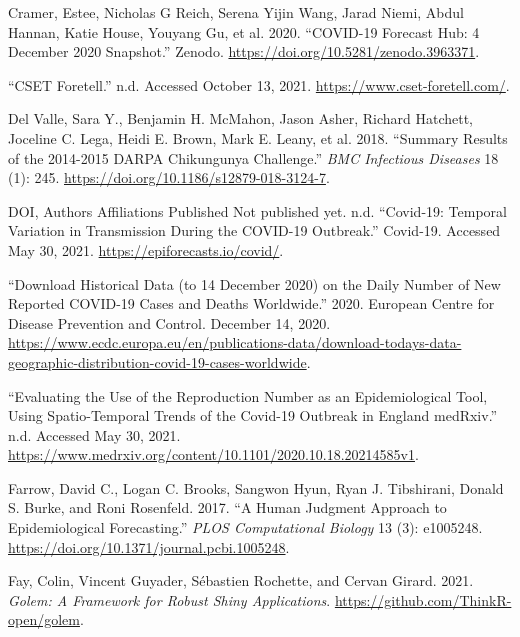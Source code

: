 \documentclass[
]{article}
\newlength{\cslhangindent}
\newlength{\cslentryspacingunit} %
\newenvironment{CSLReferences}[2] %
 {%
  \setlength{\parindent}{0pt}
  \ifodd #1
  \let\oldpar\par
  \def\par{\hangindent=\cslhangindent\oldpar}
  \fi
  \setlength{\parskip}{#2\cslentryspacingunit}
 }%
 {}
\begin{document}
\begin{CSLReferences}{1}{0}
\leavevmode{}%
Cramer, Estee, Nicholas G Reich, Serena Yijin Wang, Jarad Niemi, Abdul Hannan, Katie House, Youyang Gu, et al. 2020. {``{COVID}-19 {Forecast Hub}: 4 {December} 2020 Snapshot.''} {Zenodo}. \url{https://doi.org/10.5281/zenodo.3963371}.

\leavevmode{}%
{``{CSET Foretell}.''} n.d. Accessed October 13, 2021. \url{https://www.cset-foretell.com/}.

\leavevmode{}%
Del Valle, Sara Y., Benjamin H. McMahon, Jason Asher, Richard Hatchett, Joceline C. Lega, Heidi E. Brown, Mark E. Leany, et al. 2018. {``Summary Results of the 2014-2015 {DARPA Chikungunya} Challenge.''} \emph{BMC Infectious Diseases} 18 (1): 245. \url{https://doi.org/10.1186/s12879-018-3124-7}.

\leavevmode{}%
DOI, Authors Affiliations Published Not published yet. n.d. {``Covid-19: Temporal Variation in Transmission During the {COVID}-19 Outbreak.''} {Covid-19}. Accessed May 30, 2021. \url{https://epiforecasts.io/covid/}.

\leavevmode{}%
{``Download Historical Data (to 14 {December} 2020) on the Daily Number of New Reported {COVID}-19 Cases and Deaths Worldwide.''} 2020. {European Centre for Disease Prevention and Control}. December 14, 2020. \url{https://www.ecdc.europa.eu/en/publications-data/download-todays-data-geographic-distribution-covid-19-cases-worldwide}.

\leavevmode{}%
{``Evaluating the Use of the Reproduction Number as an Epidemiological Tool, Using Spatio-Temporal Trends of the {Covid}-19 Outbreak in {England} \textbar{} {medRxiv}.''} n.d. Accessed May 30, 2021. \url{https://www.medrxiv.org/content/10.1101/2020.10.18.20214585v1}.

\leavevmode{}%
Farrow, David C., Logan C. Brooks, Sangwon Hyun, Ryan J. Tibshirani, Donald S. Burke, and Roni Rosenfeld. 2017. {``A Human Judgment Approach to Epidemiological Forecasting.''} \emph{PLOS Computational Biology} 13 (3): e1005248. \url{https://doi.org/10.1371/journal.pcbi.1005248}.

\leavevmode{}%
Fay, Colin, Vincent Guyader, Sébastien Rochette, and Cervan Girard. 2021. \emph{Golem: A Framework for Robust Shiny Applications}. \url{https://github.com/ThinkR-open/golem}.


\end{CSLReferences}
\end{document}
